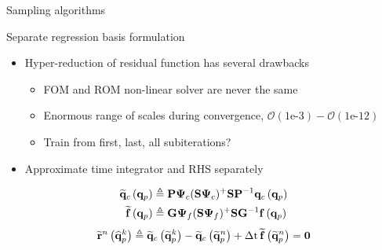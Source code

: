 \documentclass[]{beamer}
\begin{document}
\begin{frame}{Sampling algorithms}
    
\end{frame}

\begin{frame}{Separate regression basis formulation}
    \begin{itemize}
		\item Hyper-reduction of residual function has several drawbacks
		\begin{itemize}
			\item FOM and ROM non-linear solver are never the same
			\item Enormous range of scales during convergence, $\mathcal{O}(1\text{e-}3)-\mathcal{O}(1\text{e-}12)$
			\item Train from first, last, all subiterations?
		\end{itemize}
		\item Approximate time integrator and RHS separately
	\end{itemize}
	\begin{align*}
		\consFuncRom{\primVec} &\triangleq \consScale \deimRegressorCons \consScaleInv \consFunc{\primVec} \\
		\rhsApproxFunc{\primVec} &\triangleq \rhsScale \deimRegressorRhs \rhsScaleInv \rhsFunc{\primVec}
	\end{align*}
	\begin{equation*}
		\mathbf{\widetilde{r}}^{n} \left(\mathbf{\widehat{q}}_p^{k}\right) \triangleq \mathbf{\widetilde{q}}_c \left(\mathbf{\widetilde{q}}_p^{k}\right) - \mathbf{\widetilde{q}}_c \left(\mathbf{\widetilde{q}}_p^{n}\right) + \Delta \text{t} \, \mathbf{\widetilde{\mathbf{f}}}\left(\mathbf{\widetilde{q}}_p^{n}\right) = \mathbf{0}
	\end{equation*}
\end{frame}
\end{document}
